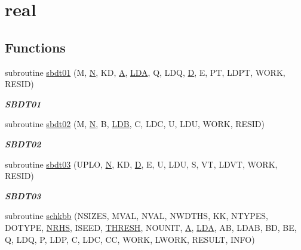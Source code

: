 \hypertarget{group__single__eig}{}\section{real}
\label{group__single__eig}
\subsection*{Functions}
\begin{DoxyCompactItemize}
\item 
subroutine \hyperlink{group__single__eig_ga8ea54400bae844773a0e4cec9ab51ccd}{sbdt01} (M, \hyperlink{polmisc_8c_a0240ac851181b84ac374872dc5434ee4}{N}, K\+D, \hyperlink{classA}{A}, \hyperlink{example__user_8c_ae946da542ce0db94dced19b2ecefd1aa}{L\+D\+A}, Q, L\+D\+Q, \hyperlink{odrpack_8h_a7dae6ea403d00f3687f24a874e67d139}{D}, E, P\+T, L\+D\+P\+T, W\+O\+R\+K, R\+E\+S\+I\+D)
\begin{DoxyCompactList}\small\item\em {\bfseries S\+B\+D\+T01} \end{DoxyCompactList}\item 
subroutine \hyperlink{group__single__eig_ga65060c7c0f1fcff75daedf24c07e1024}{sbdt02} (M, \hyperlink{polmisc_8c_a0240ac851181b84ac374872dc5434ee4}{N}, B, \hyperlink{example__user_8c_a50e90a7104df172b5a89a06c47fcca04}{L\+D\+B}, C, L\+D\+C, U, L\+D\+U, W\+O\+R\+K, R\+E\+S\+I\+D)
\begin{DoxyCompactList}\small\item\em {\bfseries S\+B\+D\+T02} \end{DoxyCompactList}\item 
subroutine \hyperlink{group__single__eig_gadade0477c176c076de24e4e719687a5d}{sbdt03} (U\+P\+L\+O, \hyperlink{polmisc_8c_a0240ac851181b84ac374872dc5434ee4}{N}, K\+D, \hyperlink{odrpack_8h_a7dae6ea403d00f3687f24a874e67d139}{D}, E, U, L\+D\+U, S, V\+T, L\+D\+V\+T, W\+O\+R\+K, R\+E\+S\+I\+D)
\begin{DoxyCompactList}\small\item\em {\bfseries S\+B\+D\+T03} \end{DoxyCompactList}\item 
subroutine \hyperlink{group__single__eig_ga561a20d64458f92f3e4cf00aab784a20}{schkbb} (N\+S\+I\+Z\+E\+S, M\+V\+A\+L, N\+V\+A\+L, N\+W\+D\+T\+H\+S, K\+K, N\+T\+Y\+P\+E\+S, D\+O\+T\+Y\+P\+E, \hyperlink{example__user_8c_aa0138da002ce2a90360df2f521eb3198}{N\+R\+H\+S}, I\+S\+E\+E\+D, \hyperlink{zlaqgs_8c_a0656018abfc9fa2821827415f5d5ea57}{T\+H\+R\+E\+S\+H}, N\+O\+U\+N\+I\+T, \hyperlink{classA}{A}, \hyperlink{example__user_8c_ae946da542ce0db94dced19b2ecefd1aa}{L\+D\+A}, A\+B, L\+D\+A\+B, B\+D, B\+E, Q, L\+D\+Q, P, L\+D\+P, C, L\+D\+C, C\+C, W\+O\+R\+K, L\+W\+O\+R\+K, R\+E\+S\+U\+L\+T, I\+N\+F\+O)

\end{DoxyCompactItemize}
